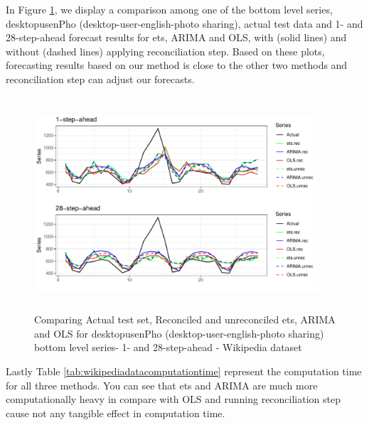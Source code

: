 \documentclass[11pt,a4paper,]{article}
\begin{document}
In Figure \ref{fig:forecstrolling24wiki}, we display a comparison among
one of the bottom level series, desktopusenPho
(desktop-user-english-photo sharing), actual test data and 1- and
28-step-ahead forecast results for ets, ARIMA and OLS, with (solid
lines) and without (dashed lines) applying reconciliation step. Based on
these plots, forecasting results based on our method is close to the
other two methods and reconciliation step can adjust our forecasts.

\begin{figure}

{\centering \includegraphics[width=400px,height=300px]{hcf_files/figure-latex/forecstrolling24wiki-1} 

}

\caption{Comparing Actual test set, Reconciled and unreconciled ets, ARIMA and OLS for desktopusenPho (desktop-user-english-photo sharing)  bottom level series- 1- and  28-step-ahead - Wikipedia dataset}\label{fig:forecstrolling24wiki}
\end{figure}

Lastly Table \ref{tab:wikipediadatacomputationtime} represent the
computation time for all three methods. You can see that ets and ARIMA
are much more computationally heavy in compare with OLS and running
reconciliation step cause not any tangible effect in computation time.
\end{document}
